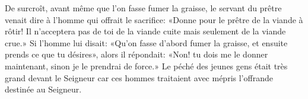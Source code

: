 De surcroît, avant même que l’on fasse fumer la graisse,
	le servant du prêtre venait dire à l’homme qui offrait le sacrifice:
	«Donne pour le prêtre de la viande à rôtir!
	Il n’acceptera pas de toi de la viande cuite mais seulement de la viande crue.»
Si l’homme lui disait:
	«Qu’on fasse d’abord fumer la graisse, et ensuite prends ce que tu désires»,
	alors il répondait:
	«Non! tu dois me le donner maintenant, sinon je le prendrai de force.»
Le péché des jeunes gens était très grand devant le Seigneur
	car ces hommes traitaient avec mépris l’offrande destinée au Seigneur.
